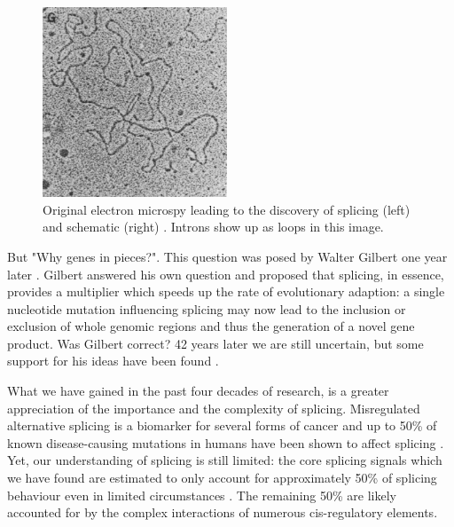 \begin{figure}
	\centering
		\includegraphics[width=0.49\textwidth]{../visualizations/ch1-introduction/original_electron_microscopy.jpg}
	\caption{Original electron microspy leading to the discovery of splicing (left) and schematic (right) \cite{discoveryofsplicing}. Introns show up as loops in this image.  }
	\label{fig:discovery}

\end{figure}

But "Why genes in pieces?". This question was posed by Walter Gilbert one year later \cite{whygenesinpieces}. Gilbert answered his own question and proposed that splicing, in essence, provides a multiplier which speeds up the rate of evolutionary adaption: a single nucleotide mutation influencing splicing may now lead to the inclusion or exclusion of whole genomic regions and thus the generation of a novel gene product. Was Gilbert correct? 42 years later we are still uncertain, but some support for his ideas have been found \cite{whyrevisited}. %

What we have gained in the past four decades of research, is a greater appreciation of the importance and the complexity of splicing. 
Misregulated alternative splicing is a biomarker for several forms of cancer \cite{cancer} \cite{splicingcausescancer} and up to 50\% of known disease-causing mutations in humans have been shown to affect splicing \cite{50diseasessplicing}. 
Yet, our understanding of splicing is still limited: the core splicing signals which we have found are estimated to only account for approximately 50\% of splicing behaviour even in limited circumstances \cite{coresplicingsignals50percentexplainit}. The remaining 50\% are likely accounted for by the complex interactions of numerous cis-regulatory elements. 

